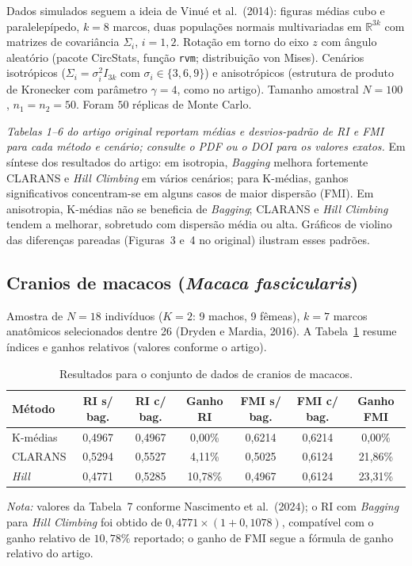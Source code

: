 \documentclass[11pt,a4paper]{article}
\begin{document}
Dados simulados seguem a ideia de Vinué et al.\ (2014): figuras médias cubo e paralelepípedo, $k=8$ marcos, duas populações normais multivariadas em $\mathbb{R}^{3k}$ com matrizes de covariância $\Sigma_i$, $i=1,2$. Rotação em torno do eixo $z$ com ângulo aleatório (pacote CircStats, função \texttt{rvm}; distribuição von Mises). Cenários isotrópicos ($\Sigma_i = \sigma_i^2 I_{3k}$ com $\sigma_i \in \{3,6,9\}$) e anisotrópicos (estrutura de produto de Kronecker com parâmetro $\gamma=4$, como no artigo). Tamanho amostral $N=100$, $n_1=n_2=50$. Foram $50$ réplicas de Monte Carlo.

\textit{Tabelas 1--6 do artigo original reportam médias e desvios-padrão de RI e FMI para cada método e cenário; consulte o PDF ou o DOI para os valores exatos.} Em síntese dos resultados do artigo: em isotropia, \emph{Bagging} melhora fortemente CLARANS e \emph{Hill Climbing} em vários cenários; para K-médias, ganhos significativos concentram-se em alguns casos de maior dispersão (FMI). Em anisotropia, K-médias não se beneficia de \emph{Bagging}; CLARANS e \emph{Hill Climbing} tendem a melhorar, sobretudo com dispersão média ou alta. Gráficos de violino das diferenças pareadas (Figuras~3 e~4 no original) ilustram esses padrões.

\subsection{Cranios de macacos (\emph{Macaca fascicularis})}

Amostra de $N=18$ indivíduos ($K=2$: 9 machos, 9 fêmeas), $k=7$ marcos anatômicos selecionados dentre 26 (Dryden e Mardia, 2016). A Tabela~\ref{tab:macacos} resume índices e ganhos relativos (valores conforme o artigo).

\begin{table}[ht]\centering
\caption{Resultados para o conjunto de dados de cranios de macacos.}
\label{tab:macacos}
\begin{tabular}{lcccccc}
\toprule
Método & RI s/ bag. & RI c/ bag. & Ganho RI & FMI s/ bag. & FMI c/ bag. & Ganho FMI \\
\midrule
K-médias      & 0{,}4967 & 0{,}4967 & 0{,}00\%  & 0{,}6214 & 0{,}6214 & 0{,}00\% \\
CLARANS       & 0{,}5294 & 0{,}5527 & 4{,}11\%  & 0{,}5025 & 0{,}6124 & 21{,}86\% \\
\emph{Hill}   & 0{,}4771 & 0{,}5285 & 10{,}78\% & 0{,}4967 & 0{,}6124 & 23{,}31\% \\
\bottomrule
\end{tabular}
\end{table}
\noindent\small\textit{Nota:} valores da Tabela~7 conforme Nascimento et al.\ (2024); o RI com \emph{Bagging} para \emph{Hill Climbing} foi obtido de $0{,}4771 \times (1 + 0{,}1078)$, compatível com o ganho relativo de $10{,}78\%$ reportado; o ganho de FMI segue a fórmula de ganho relativo do artigo.
\end{document}

